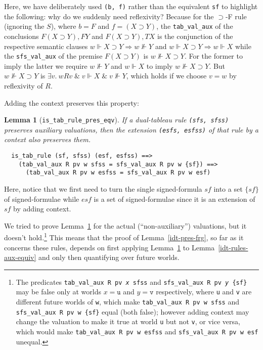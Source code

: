 \documentclass[a4paper]{article}
\newtheorem{lemma}{Lemma}
\begin{document}
Here, we have deliberately used \texttt{(b, f)} rather than the
equivalent \texttt{sf} to highlight the following: why do we suddenly
need reflexivity?  
Because for the $\supset$-F
rule (ignoring the $S$), where $b=F$ and $f = (X \supset Y)$, the
\texttt{tab\_val\_aux} of the conclusions $F (X \supset Y), F Y$
and $F (X \supset Y), T X$ is the conjunction of the respective
semantic clauses $w \Vdash X \supset Y \Rightarrow w \not\Vdash Y$ and
$w \Vdash X \supset Y \Rightarrow w \Vdash X$ while the
\texttt{sfs\_val\_aux} of the premise $F (X \supset Y)$ is
$w \not\Vdash X \supset Y$.  For the former to imply the latter we
require $w \not\Vdash Y$ and $w \Vdash X$ to imply
$w \not\Vdash X \supset Y$.  But $w \not\Vdash X \supset Y$ is
$\exists v.\ w R v \;\&\; v \Vdash X \;\&\; v \not\Vdash Y$, which
holds if we choose $v=w$ by reflexivity of $R$.

Adding the context preserves this property:
\begin{lemma}[\texttt{is\_tab\_rule\_pres\_eqv}] \label{is-tab-rule-pres-eqv}
If a dual-tableau rule \texttt{(sfs, sfss)} 
preserves auxiliary valuations,
then the extension \texttt{(esfs, esfss)} of that rule 
by a context also preserves them.
\end{lemma}
\begin{verbatim}
  is_tab_rule (sf, sfss) (esf, esfss) ==>
    (tab_val_aux R pv w sfss = sfs_val_aux R pv w {sf}) ==>
      (tab_val_aux R pv w esfss = sfs_val_aux R pv w esf)
\end{verbatim}

Here, notice that we first need to turn the single signed-formula $sf$
into a set $\{sf\}$ of signed-formulae while $esf$ is a set of
signed-formulae since it is an extension of $sf$ by adding context.

We tried to prove Lemma~\ref{is-tab-rule-pres-eqv}
for the actual (``non-auxiliary'') valuations,
but it doesn't hold.\footnote{
The predicates \texttt{tab\_val\_aux R pv \textit{x} sfss} and 
\texttt{sfs\_val\_aux R pv \textit{y} \{sf\}} 
may be false only at worlds $x = \texttt{u}$ and $y = \texttt{v}$ 
respectively, where \texttt{u} and \texttt{v}
are different future worlds of \texttt{w},
which make
\texttt{tab\_val\_aux R pv w sfss} and \texttt{sfs\_val\_aux R pv w \{sf\}}
equal (both false);
however adding context may change the valuation to make it true
at world \texttt{u} but not \texttt{v}, or vice versa,
which would make 
\texttt{tab\_val\_aux R pv w esfss} and \texttt{sfs\_val\_aux R pv w esf}
unequal.}
This means that the proof of Lemma~\ref{idt-pres-frg}, 
so far as it concerns these rules, depends on first applying 
Lemma~\ref{is-tab-rule-pres-eqv} to Lemma~\ref{idt-rules-aux-equiv}
and only then quantifying over future worlds.  
\end{document}

